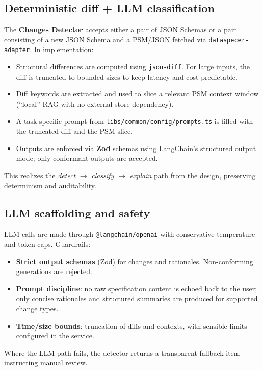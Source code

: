 \subsection{Deterministic diff + LLM classification}
The \textbf{Changes Detector} accepts either a pair of JSON Schemas or a pair consisting of a new JSON Schema and a PSM/JSON fetched via \texttt{dataspecer-adapter}. In implementation:
\begin{itemize}
  \item Structural differences are computed using \texttt{json-diff}. For large inputs, the diff is truncated to bounded sizes to keep latency and cost predictable.
  \item Diff keywords are extracted and used to slice a relevant PSM context window (``local'' RAG with no external store dependency).
  \item A task-specific prompt from \texttt{libs/common/config/prompts.ts} is filled with the truncated diff and the PSM slice.
  \item Outputs are enforced via \textbf{Zod} schemas using LangChain’s structured output mode; only conformant outputs are accepted.
\end{itemize}
This realizes the \emph{detect} $\rightarrow$ \emph{classify} $\rightarrow$ \emph{explain} path from the design, preserving determinism and auditability.

\subsection{LLM scaffolding and safety}
LLM calls are made through \texttt{@langchain/openai} with conservative temperature and token caps. Guardrails:
\begin{itemize}
  \item \textbf{Strict output schemas} (Zod) for changes and rationales. Non-conforming generations are rejected.
  \item \textbf{Prompt discipline}: no raw specification content is echoed back to the user; only concise rationales and structured summaries are produced for supported change types.
  \item \textbf{Time/size bounds}: truncation of diffs and contexts, with sensible limits configured in the service.
\end{itemize}
Where the LLM path fails, the detector returns a transparent fallback item instructing manual review.

